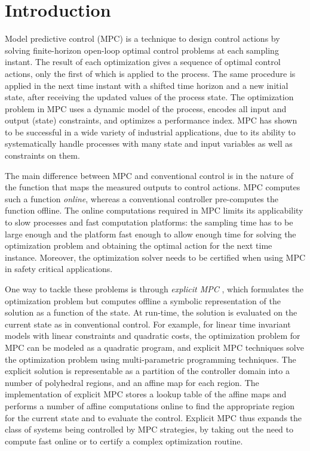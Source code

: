 \section{Introduction}
Model predictive control (MPC) is a technique to design control actions by solving finite-horizon open-loop
optimal control problems at each sampling instant.
The result of each optimization gives a sequence of optimal control actions, only the first of which is applied
to the process.
The same procedure is applied in the next time instant with a shifted time horizon and a new initial state, 
after receiving the updated values of the process state.
The optimization problem in MPC uses a dynamic model of the process, encodes all input and output (state) constraints, and 
optimizes a performance index. 
MPC has shown to be successful in a wide variety of industrial applications, due to its 
ability to systematically handle processes with many state and input variables as well as constraints on them. 

The main difference between MPC and conventional control is in the nature of the function that maps the measured outputs to control actions. 
MPC computes such a function \emph{online}, whereas a conventional controller pre-computes the function offline.
The online computations required in MPC limits its applicability to slow processes and fast computation platforms: 
the sampling time has to be large enough and the platform fast enough to allow enough time for solving the optimization problem
and obtaining the optimal action for the next time instance. 
Moreover, the optimization solver needs to be certified when using MPC in safety critical applications.

One way to tackle these problems is through \emph{explicit MPC} \cite{Bemporad:2002,Alessio2009}, which formulates the optimization
problem but computes offline a symbolic representation of the solution as a function of the state.
At run-time, the solution is evaluated on the current state as in conventional control.
For example, for linear time invariant models with linear constraints and quadratic costs, the optimization
problem for MPC can be modeled as a quadratic program, and explicit MPC techniques solve the optimization problem
using multi-parametric programming techniques.
The explicit solution is representable as a partition of the controller domain into a number of polyhedral regions,
and an affine map for each region.
The implementation of explicit MPC stores a lookup table of the affine maps and performs a number of affine computations
online to find the appropriate region for the current state and to evaluate the control.  
Explicit MPC thus expands the class of systems being controlled by MPC strategies, by taking out the need to compute fast online
or to certify a complex optimization routine.

